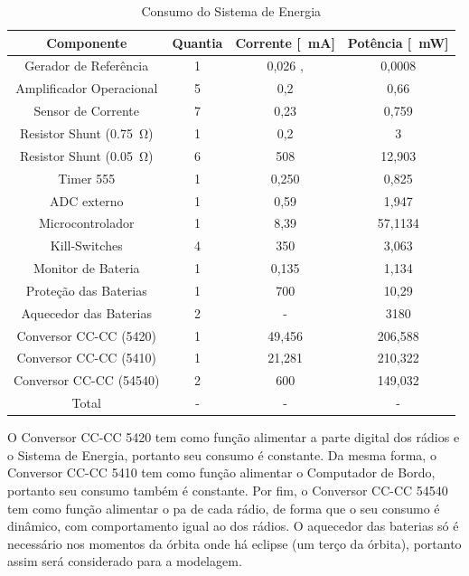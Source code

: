 \begin{table}[!htpb]
\centering
\begin{tabular}{c c c c}
\\ \hline
Componente & Quantia & Corrente [\SI{}{\milli\ampere}] & Potência [\SI{}{\milli\watt}] \\ \hline \hline
Gerador de Referência & 1 & 0,026 \cite{ref5030}, \cite{msp430f6659} & 0,0008 \cite{ref5030} \\
Amplificador Operacional & 5 & 0,2 \cite{tlv341} & 0,66 \\
Sensor de Corrente & 7 & 0,23 \cite{max9934} & 0,759 \\
Resistor Shunt (\SI{0,75}{\ohm}) & 1 & 0,2 & 3 \\
Resistor Shunt (\SI{0,05}{\ohm}) & 6 & 508 & 12,903 \\
Timer 555 & 1 & 0,250 \cite{lmc555} & 0,825 \\
ADC externo & 1 & 0,59 \cite{ads1248} & 1,947 \\
Microcontrolador & 1 & 8,39 \cite{msp430f6659} & 57,1134 \cite{msp430f6659} \\
Kill-Switches & 4 & 350 & 3,063 \cite{si4403} \\
Monitor de Bateria & 1 & 0,135 \cite{ds2775} & 1,134 \cite{ds2775} \\
Proteção das Baterias & 1 & 700 & 10,29 \cite{fds6898az} \\
Aquecedor das Baterias & 2 & - & 3180\\
Conversor CC-CC (5420) & 1 & 49,456 & 206,588 \cite{tps5420} \\
Conversor CC-CC (5410) & 1 & 21,281 & 210,322 \cite{tps5410} \\
Conversor CC-CC (54540) & 2 & 600 & 149,032 \cite{tps54540} \\ \hline
Total & - & - & - \\ \hline
\end{tabular}
\caption{Consumo do Sistema de Energia}
\label{consumo_eps}
\end{table}

O Conversor CC-CC 5420 tem como função alimentar a parte digital dos rádios e o Sistema de Energia, portanto seu consumo é constante. Da mesma forma, o Conversor CC-CC 5410 tem como função alimentar o Computador de Bordo, portanto seu consumo também é constante. Por fim, o Conversor CC-CC 54540 tem como função alimentar o \gls{pa} de cada rádio, de forma que o seu consumo é dinâmico, com comportamento igual ao dos rádios. O aquecedor das baterias só é necessário nos momentos da órbita onde há eclipse (um terço da órbita), portanto assim será considerado para a modelagem.

